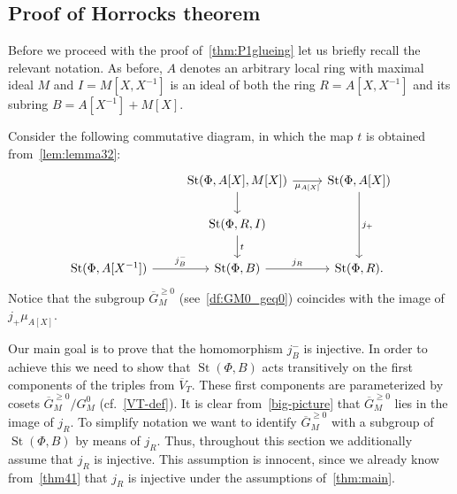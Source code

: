 \documentclass[oneside, 8pt]{amsart}
\theoremstyle{remark}
\theoremstyle{definition}
\numberwithin{lemma}{section}
\numberwithin{prop}{section}
\numberwithin{corollary}{section}
\numberwithin{externaltheorem}{section}
\DeclareMathOperator{\St}{St}
\newcommand{\inv}{^{-1}}
\numberwithin{equation}{section}
\begin{document}
\subsection{Proof of Horrocks theorem} \label{sec:P1glueing}
Before we proceed with the proof of~\cref{thm:P1glueing} let us briefly recall the relevant notation. As before, $A$ denotes an arbitrary local ring with maximal ideal $M$ and $I = M[X, X\inv]$ is an ideal of both the ring $R=A[X, X\inv]$ and its subring $B = A[X\inv] + M[X]$.

Consider the following commutative diagram, in which the map $t$ is obtained from~\cref{lem:lemma32}:
\begin{equation} \label{big-picture} \begin{tikzcd} & \St(\Phi, A[X], M[X]) \arrow{r}[swap]{\mu_{A[X]}} \arrow{d} & \St(\Phi, A[X]) \arrow{dd}{j_+} \\ & \St(\Phi, R, I) \arrow{d}{t} & \\ \St(\Phi, A[X\inv]) \arrow{r}{j_B^-} & \St(\Phi, B) \arrow{r}{j_R} & \St(\Phi, R). \end{tikzcd} \end{equation}
Notice that the subgroup $\overline{G}_M^{\geq 0}$ (see~\cref{df:GM0_geq0}) coincides with the image of $j_+\mu_{A[X]}$.

Our main goal is to prove that the homomorphism $j_B^-$ is injective. 
In order to achieve this we need to show that $\St(\Phi, B)$ acts transitively on the first components of the triples from $\overline{V}_T$. These first components are parameterized by cosets $\overline{G}_M^{\geq 0}/G_M^0$ (cf.~\eqref{VT-def}). It is clear from~\eqref{big-picture} that $\overline{G}_M^{\geq 0}$ lies in the image of $j_R$.
To simplify notation we want to identify $\overline{G}_M^{\geq 0}$ with a subgroup of $\St(\Phi, B)$ by means of $j_R$. Thus, throughout this section we additionally assume that $j_R$ is injective. This assumption is innocent, since we already know from~\cref{thm41} that $j_R$ is injective under the assumptions of~\cref{thm:main}.
\end{document}

